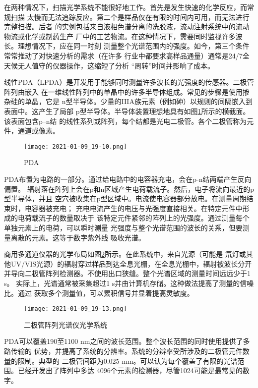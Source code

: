 在两种情况下，扫描光学系统不能很好地工作。首先是发生快速的化学反应，而常规扫描
太慢而无法追踪反应。第二个是样品仅在有限的时间内可用，而无法进行完整扫描。后者
的实例包括来自液相色谱分离的洗脱液，流动注射系统中的流动物流或化学或制药生产
厂中的工艺物流。在这种情况下，需要同时监视许多波长。理想情况下，应在同一时刻
测量整个光谱范围内的强度。如今，第三个条件常常推动了对快速分析的需求（在许多
行业中都要求高样品通量）通常是24/7全天候无人值守的仪器操作，这缩短了分析
“周转”时间并影响了成本。

线性PDA（LPDA）是开发用于能够同时测量许多波长的光强度的传感器。二极管阵列由嵌入
在一维线性阵列中的单晶中的许多半导体组成。常见的步骤是使用掺杂硅的单晶，它是
n型半导体。少量的IIIA族元素（例如砷）以规则的间隔嵌入到表面中。这产生了局部
p型半导体。半导体装置理想地具有如图\ref{fig:5.24}所示的横截面。该表面包含p–n结
的线性系列或阵列，每个结都是光电二极管。各个二极管称为元件，通道或像素。
\begin{figure}[htpb]
    \centering
    \texttt{[image: 2021-01-09\_19-10.png]}
    \caption{PDA}
    \label{fig:5.24}
\end{figure}

PDA布置为电路的一部分。通过给电路中的电容器充电，会在p-n结两端产生反向偏置。
辐射落在阵列上会在p和n区域产生电荷载流子。然后，电子将流向最近的p型半导体，并且
空穴被收集在p型区域中。电流使电容器部分放电。在测量周期结束时，电容器被充电；
充电电流产生的电压与光强度直接相关。在特定元件中形成的电荷载流子的数量取决于
该特定元件紧邻的阵列上的光强度。通过测量每个单独元素上的电荷，可以瞬时测量
光强度与整个光谱范围的波长的关系，但要测量离散的元素。这等于数字紫外线
吸收光谱。

商用多通道仪器的光学布局如图\ref{fig:5.25}所示。在此系统中，来自光源（可能是
氘灯或其他UV/VIS光源）的辐射穿过样品到达全息光栅，在全息光栅中，辐射被波长分开
并导向二极管阵列检测器。不使用出口狭缝。整个光谱区域的测量时间远远少于1 s。
实际上，光谱通常被采集超过1 s并由计算机存储。这种做法提高了测量的信噪比。通过
获取多个测量值，可以累积信号并显着提高灵敏度。
\begin{figure}[htpb]
    \centering
    \texttt{[image: 2021-01-09\_19-13.png]}
    \caption{二极管阵列光谱仪光学系统}
    \label{fig:5.25}
\end{figure}

PDA可以覆盖190至1100 nm之间的波长范围。整个波长范围的同时使用提供了多路传输的
优势，并提高了系统的分辨率。系统的分辨率受所涉及的二极管元件数量的限制。典型的
二极管间距为0.025 mm。可以认为每个覆盖了有限的光谱范围。已经开发出了阵列中多达
4096个元素的检测器，尽管1024可能是最常见的数字。

